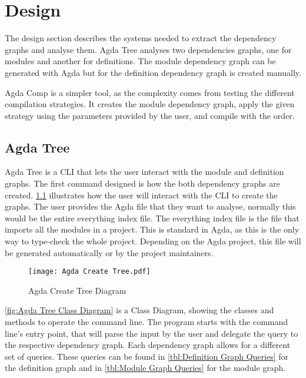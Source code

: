 
\chapter{Design}

The design section describes the systems needed to extract the dependency
graphs and analyse them. Agda Tree analyses two dependencies graphs, one for
modules and another for definitions. The module dependency graph can be
generated with Agda but for the definition dependency graph is created
manually.

Agda Comp is a simpler tool, as the complexity comes from testing the different
compilation strategies. It creates the module dependency graph, apply the
given strategy using the parameters provided by the user, and compile with the
order. 

\pagebreak

\section{Agda Tree}

Agda Tree is a CLI that lets the user interact with the
module and definition graphs. The first command designed is how the both
dependency graphs are created. \cref{fig:Agda Create Tree Diagram} illustrates
how the user will interact with the CLI to create the graphs. The user provides
the Agda file that they want to analyse, normally this would be the entire
everything index file. The everything index file is the file that imports all
the modules in a project. This is standard in Agda, as this is the only way to
type-check the whole project. Depending on the Agda project, this file will be
generated automatically or by the project maintainers.
\begin{figure}[H]
    \centering
    \texttt{[image: Agda Create Tree.pdf]}
    \caption{Agda Create Tree Diagram}
    \label{fig:Agda Create Tree Diagram}
\end{figure} 

\pagebreak

\cref{fig:Agda Tree Class Diagram} is a Class Diagram, showing the classes and
methods to operate the command line. The program starts with the command line's
entry point, that will parse the input by the user and delegate the query to
the respective dependency graph. Each dependency graph allows for a different
set of queries. These queries can be found in \cref{tbl:Definition Graph
Queries} for the definition graph and in \cref{tbl:Module Graph Queries} for
the module graph.

